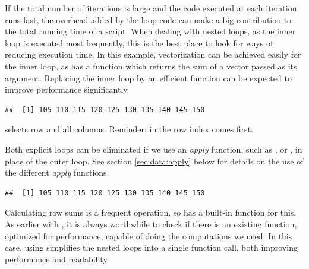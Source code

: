 \documentclass[krantz2]{krantz}\usepackage{knitr}
\begin{document}
\begin{explainbox}
If the total number of iterations is large and the code executed at each iteration runs fast, the overhead added by the loop code can make a big contribution to the total running time of a script.
When dealing with nested loops, as the inner loop is executed most frequently, this is the best place to look for ways of reducing execution time. In this example, vectorization can be achieved easily for the inner loop, as \Rlang has a function  which returns the sum of a vector passed as its argument. Replacing the inner loop by an efficient function can be expected to improve performance significantly.

\begin{knitrout}\footnotesize
{}\color{fgcolor}\begin{kframe}
\begin{alltt}
 \hlkwb{<-} \hlstd{(} 
   \hlopt{:}
   \hlkwb{<-} 
\hlstd{\}}
\end{alltt}
\begin{verbatim}
##  [1] 105 110 115 120 125 130 135 140 145 150
\end{verbatim}
\end{kframe}
\end{knitrout}

 selects row  and all columns. Reminder: in \Rlang the row index comes first.

Both explicit loops can be eliminated if we use an \emph{apply} function, such as ,  or , in place of the outer  loop. See section \ref{sec:data:apply} below %
for details on the use of the different \emph{apply} functions.

\begin{knitrout}\footnotesize
{}\color{fgcolor}\begin{kframe}
\begin{alltt}
 \hlkwb{<-}   \hlstd{=}  
\end{alltt}
\begin{verbatim}
##  [1] 105 110 115 120 125 130 135 140 145 150
\end{verbatim}
\end{kframe}
\end{knitrout}
Calculating row sums is a frequent operation, so \Rlang has a built-in function for this. As earlier with , it is always worthwhile to check if there is an existing \Rlang function, optimized for performance, capable of doing the computations we need. In this case, using  simplifies the nested loops into a single function call, both improving performance and readability.


\end{explainbox}
\end{document}
